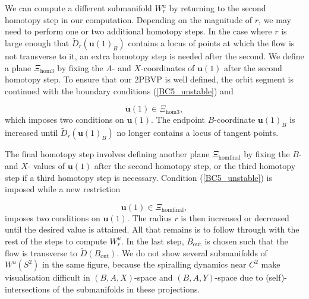 \documentclass{ws-ijbc}
\begin{document}
We can compute a different submanifold $W^u_r$ by returning to the second homotopy step in our computation.   Depending on the magnitude of $r$, we may need to perform one or two additional homotopy steps.  In the case where $r$ is large enough that $\widetilde{D}_r(\mathbf{u}(1)_B)$ contains a locus of points at which the flow is not transverse to it, an extra homotopy step is needed after the second.  We define a plane $\Xi_{\mathrm{hom3}}$ by fixing the $A$- and $X$-coordinates of $\mathbf{u}(1)$ after the second homotopy step.  To ensure that our 2PBVP is well defined, the orbit segment is continued with the boundary conditions (\ref{BC5_unstable}) and

\begin{equation}
\mathbf{u}(1) \in \Xi_{\mathrm{hom3}},
\label{BC8_unstable}
\end{equation}
\noindent
which imposes two conditions on $\mathbf{u}(1)$.  The endpoint $B$-coordinate $\mathbf{u}(1)_B$ is increased until $\widetilde{D}_r(\mathbf{u}(1)_B)$ no longer contains a locus of tangent points.

The final homotopy step involves defining another plane $\Xi_{\mathrm{homfinal}}$ by fixing the $B$- and $X$- values of $\mathbf{u}(1)$ after the second homotopy step, or the third homotopy step if a third homotopy step is necessary.  Condition (\ref{BC5_unstable}) is imposed while a new restriction

\begin{equation}
\mathbf{u}(1) \in \Xi_{\mathrm{homfinal}},
\label{BC9_unstable}
\end{equation}
\noindent
imposes two conditions on $\mathbf{u}(1)$.  The radius $r$ is then increased or decreased until the desired value is attained.  All that remains is to follow through with the rest of the steps to compute $W^u_r$.  In the last step, $B_{\text{out}}$ is chosen such that the flow is transverse to $\widetilde{D}(B_{\text{out}})$.  We do not show several submanifolds of $W^u(S^2)$ in the same figure, because the spiralling dynamics near $C^2$ make visualisation difficult in $(B,A,X)$-space and $(B,A,Y)$-space due to (self)-intersections of the submanifolds in these projections.
\end{document}
